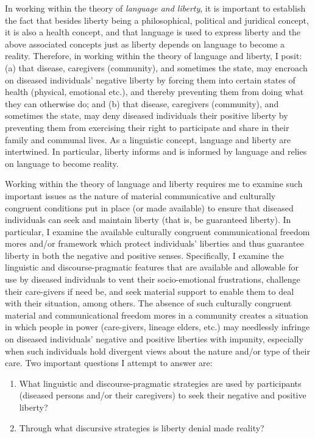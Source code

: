 \documentclass[output=paper,colorlinks,citecolor=brown]{langscibook}
\begin{document}
In working within the theory of \textit{language and liberty}, it is important to establish the fact that besides liberty being a philosophical, political and juridical concept, it is also a health concept, and that language is used to express liberty and the above associated concepts just as liberty depends on language to become a reality. Therefore, in working within the theory of language and liberty, I posit: (a) that disease, caregivers (community), and sometimes the state, may encroach on diseased individuals’ negative liberty by forcing them into certain states of health (physical, emotional etc.), and thereby preventing them from doing what they can otherwise do; and (b) that disease, caregivers (community), and sometimes the state, may deny diseased individuals their positive liberty by preventing them from exercising their right to participate and share in their family and communal lives. As a linguistic concept, language and liberty are intertwined. In particular, liberty informs and is informed by language and relies on language to become reality. 

Working within the theory of language and liberty requires me to examine such important issues as the nature of material communicative and culturally congruent conditions put in place (or made available) to ensure that diseased individuals can seek and maintain liberty (that is, be guaranteed liberty). In particular, I examine the available culturally congruent communicational freedom mores and/or framework which protect individuals’ liberties and thus guarantee liberty in both the negative and positive senses. Specifically, I examine the linguistic and discourse-pragmatic features that are available and allowable for use by diseased individuals to vent their socio-emotional frustrations, challenge their care-givers if need be, and seek material support to enable them to deal with their situation, among others. The absence of such culturally congruent material and communicational freedom mores in a community creates a situation in which people in power (care-givers, lineage elders, etc.) may needlessly infringe on diseased individuals’ negative and positive liberties with impunity, especially when such individuals hold divergent views about the nature and/or type of their care. Two important questions I attempt to answer are: 

\begin{enumerate}\sloppy
\item What linguistic and discourse-pragmatic strategies are used by participants (diseased persons and/or their caregivers) to seek their negative and positive liberty?
\item Through what discursive strategies is liberty denial made reality?
\end{enumerate}
\end{document}
